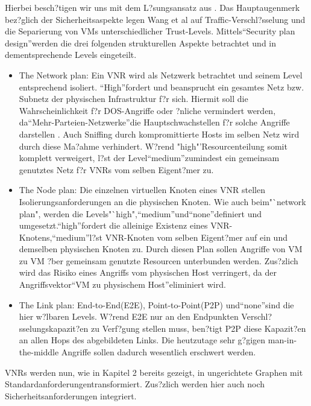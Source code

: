 \documentclass{lni}
\begin{document}
Hierbei besch?tigen wir uns mit dem L?sungsansatz aus \cite{wang2016towards}. 
Das Hauptaugenmerk bez?glich der Sicherheitsaspekte legen Wang et al auf Traffic-Verschl?sselung und die Separierung von VMs unterschiedlicher Trust-Levels. Mittels"`Security plan design"'werden die drei folgenden strukturellen Aspekte betrachtet und in dementsprechende Levels eingeteilt.
\begin{itemize}
\item The Network plan:\newline
Ein VNR wird als Netzwerk betrachtet und seinem Level entsprechend isoliert. "`High"'fordert und beansprucht ein gesamtes Netz bzw. Subnetz der physischen Infrastruktur f?r sich. Hiermit soll die Wahrscheinlichkeit f?r DOS-Angriffe oder ?nliche vermindert werden, da"`Mehr-Parteien-Netzwerke"'die Hauptschwachstellen f?r solche Angriffe darstellen \cite{DOS}. Auch Sniffing durch kompromittierte Hosts im selben Netz wird durch diese Ma?ahme verhindert. W?rend "high"'Resourcenteilung somit komplett verweigert, l?st der Level"`medium"'zumindest ein gemeinsam genutztes Netz f?r VNRs vom selben Eigent?mer zu.

\item The Node plan:\newline
Die einzelnen virtuellen Knoten eines VNR stellen Isolierungsanforderungen an die physischen Knoten. Wie auch beim"`network plan", werden die Levels"`high","`medium"'und"`none"'definiert und umgesetzt."`high"'fordert die alleinige Existenz eines VNR-Knotens,"`medium"'l?st VNR-Knoten vom selben Eigent?mer auf ein und demselben physischen Knoten zu. Durch diesen Plan sollen Angriffe von VM zu VM ?ber gemeinsam genutzte Resourcen unterbunden werden. Zus?zlich wird das Risiko eines Angriffs vom physischen Host verringert, da der Angriffsvektor"`VM zu physischem Host"'eliminiert wird.

\item The Link plan:\newline
End-to-End(E2E), Point-to-Point(P2P) und"`none"'sind die hier w?lbaren Levels. W?rend E2E nur an den Endpunkten Verschl?sselungskapazit?en zu Verf?gung stellen muss, ben?tigt P2P diese Kapazit?en an allen Hops des abgebildeten Links. Die heutzutage sehr g?gigen man-in-the-middle Angriffe sollen dadurch wesentlich erschwert werden. 
\end{itemize}
VNRs werden nun, wie in Kapitel 2 bereits gezeigt, in ungerichtete Graphen mit Standardanforderungentransformiert. Zus?zlich werden hier auch noch Sicherheitsanforderungen integriert.\newline
\end{document}
